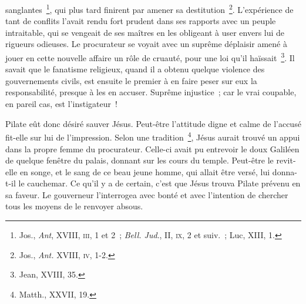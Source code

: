 \documentclass[french,twoside]{book} %
\begin{document}
sanglantes \footnote{ Jos., {\itshape Ant}, XVIII, \textsc{iii}, 1 et 2 ; {\itshape Bell. Jud}., II, \textsc{ix}, 2 et suiv. ; Luc, XIII, 1.}, qui plus tard finirent par amener sa destitution \footnote{ Jos., {\itshape Ant.} XVIII, \textsc{iv}, 1-2.}. L’expérience de tant de conflits l’avait rendu fort prudent dans ses rapports avec un peuple intraitable, qui se vengeait de ses maîtres en les obligeant à user envers lui de rigueurs odieuses. Le procurateur se voyait avec un suprême déplaisir amené à jouer en cette nouvelle affaire un rôle de cruauté, pour une loi qu’il haïssait \footnote{Jean, XVIII, 35.}. Il savait que le fanatisme religieux, quand il a obtenu quelque violence des gouvernements civils, est ensuite le premier à en faire peser sur eux la responsabilité, presque à les en accuser. Suprême injustice ; car le vrai coupable, en pareil cas, est l’instigateur !\par
Pilate eût donc désiré sauver Jésus. Peut-être l’attitude digne et calme de l’accusé fit-elle sur lui de l’impression. Selon une tradition \footnote{Matth., XXVII, 19.}, Jésus aurait trouvé un appui dans la propre femme du procurateur. Celle-ci avait pu entrevoir le doux Galiléen de quelque fenêtre du palais, donnant sur les cours du temple. Peut-être le revit-elle en songe, et le sang de ce beau jeune homme, qui allait être versé, lui donna-t-il le cauchemar. Ce qu’il y a de certain, c’est que Jésus trouva Pilate prévenu en sa faveur. Le gouverneur l’interrogea avec bonté et avec l’intention de chercher tous les moyens de le renvoyer absous.\par
\end{document}
